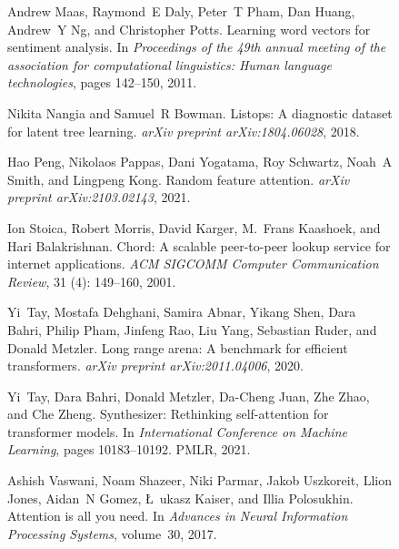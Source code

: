 \documentclass{article}
\begin{document}
\begin{figure}[t]
\begin{center}
\begin{thebibliography}{29}
Andrew Maas, Raymond~E Daly, Peter~T Pham, Dan Huang, Andrew~Y Ng, and
  Christopher Potts.
\newblock Learning word vectors for sentiment analysis.
\newblock In \emph{Proceedings of the 49th annual meeting of the association
  for computational linguistics: Human language technologies}, pages 142--150,
  2011.

Nikita Nangia and Samuel~R Bowman.
\newblock Listops: A diagnostic dataset for latent tree learning.
\newblock \emph{arXiv preprint arXiv:1804.06028}, 2018.

Hao Peng, Nikolaos Pappas, Dani Yogatama, Roy Schwartz, Noah~A Smith, and
  Lingpeng Kong.
\newblock Random feature attention.
\newblock \emph{arXiv preprint arXiv:2103.02143}, 2021.

Ion Stoica, Robert Morris, David Karger, M.~Frans Kaashoek, and Hari
  Balakrishnan.
\newblock Chord: A scalable peer-to-peer lookup service for internet
  applications.
\newblock \emph{ACM SIGCOMM Computer Communication Review}, 31
  (4): 149--160, 2001.

Yi~Tay, Mostafa Dehghani, Samira Abnar, Yikang Shen, Dara Bahri, Philip Pham,
  Jinfeng Rao, Liu Yang, Sebastian Ruder, and Donald Metzler.
\newblock Long range arena: A benchmark for efficient transformers.
\newblock \emph{arXiv preprint arXiv:2011.04006}, 2020.

Yi~Tay, Dara Bahri, Donald Metzler, Da-Cheng Juan, Zhe Zhao, and Che Zheng.
\newblock Synthesizer: Rethinking self-attention for transformer models.
\newblock In \emph{International Conference on Machine Learning}, pages
  10183--10192. PMLR, 2021.

Ashish Vaswani, Noam Shazeer, Niki Parmar, Jakob Uszkoreit, Llion Jones,
  Aidan~N Gomez, \L~ukasz Kaiser, and Illia Polosukhin.
\newblock Attention is all you need.
\newblock In \emph{Advances in Neural Information Processing Systems},
  volume~30, 2017{}.


\end{thebibliography}
\end{center}
\end{figure}
\end{document}
